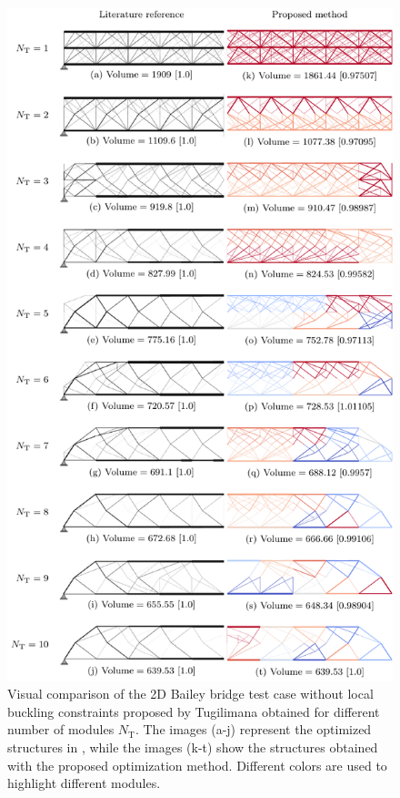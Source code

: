 \begin{figure}
    \centering
    \includegraphics{figures/06_DMO/00_tug_bench/bench.pdf}
    \caption{Visual comparison of the 2D Bailey bridge test case without local buckling constraints proposed by Tugilimana \etal \cite{tugilimana_integrated_2019} obtained for different number of modules $N_\text{T}$. The images (a-j) represent the optimized structures in \cite{tugilimana_integrated_2019}, while the images (k-t) show the structures obtained with the proposed optimization method. Different colors are used to highlight different modules.}
    \label{fig:00_tug_bench}
\end{figure}

